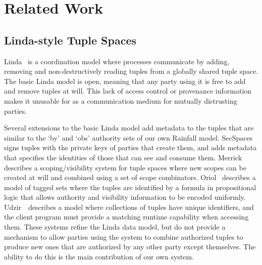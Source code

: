 

\label{s:Related}
\section{Related Work}



\subsection{Linda-style Tuple Spaces}
Linda~\cite{Gelernter1985:Linda} is a coordination model where processes communicate by adding, removing and non-destructively reading tuples from a globally shared tuple space. The basic Linda model is open, meaning that any party using it is free to add and remove tuples at will. This lack of access control or provenance information makes it unusable for as a communication medium for mutually distrusting parties.

Several extensions to the basic Linda model add metadata to the tuples that are similar to the `by' and `obs' authority sets of our own Rainfall model. SecSpaces~\cite{Busi2003:SecSpaces} signs tuples with the private keys of parties that create them, and adds metadata that specifies the identities of those that can see and consume them. Merrick~\cite{Merrick2000:Scopes} describes a scoping/visibility system for tuple spaces where new scopes can be created at will and combined using a set of scope combinators. Oriol~\cite{Oriol2005:TaggedSets} describes a model of tagged sets where the tuples are identified by a formula in propositional logic that allows authority and visibility information to be encoded uniformly. Udzir~\cite{Udzir2007:MultiCapabilities}~describes a model where collections of tuples have unique identifiers, and the client program must provide a matching runtime capability when accessing them. These systems refine the Linda data model, but do not provide a mechanism to allow parties using the system to combine authorized tuples to produce new ones that are authorized by any other party except themselves. The ability to do this is the main contribution of our own system.


